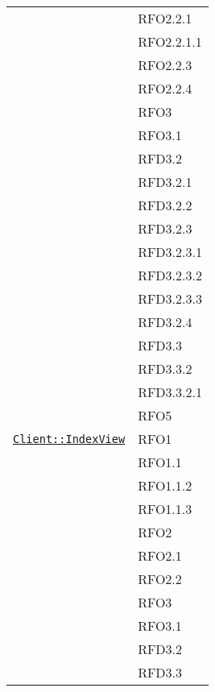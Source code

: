 \begin{longtable}{|>{\centering}m{10cm}|m{3cm}<{\centering}|}
& RFO2.2.1\\
& RFO2.2.1.1\\
& RFO2.2.3\\
& RFO2.2.4\\
& RFO3\\
& RFO3.1\\
& RFD3.2\\
& RFD3.2.1\\
& RFD3.2.2\\
& RFD3.2.3\\
& RFD3.2.3.1\\
& RFD3.2.3.2\\
& RFD3.2.3.3\\
& RFD3.2.4\\
& RFD3.3\\
& RFD3.3.2\\
& RFD3.3.2.1\\
& RFO5\\ \hline

\hyperref[Client::IndexView]{\texttt{Client::IndexView}} & RFO1\\
& RFO1.1\\
& RFO1.1.2\\
& RFO1.1.3\\
& RFO2\\
& RFO2.1\\
& RFO2.2\\
& RFO3\\
& RFO3.1\\
& RFD3.2\\
& RFD3.3\\ \hline


\end{longtable}
